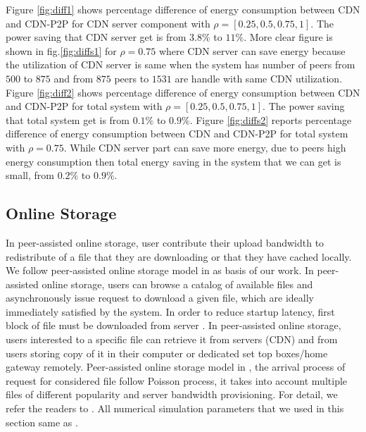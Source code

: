 Figure \ref{fig:diff1} shows percentage difference of energy consumption between CDN and CDN-P2P for CDN server component with $\rho=[0.25,0.5,0.75,1]$.
The power saving that CDN server get is from $3.8\%$ to $11\%$.
More clear figure is shown in fig.\ref{fig:diffs1} for $\rho=0.75$ where CDN server can save energy because the utilization of CDN server is same when the system has number of peers from $500$ to $875$ and from $875$ peers to $1531$ are handle with same CDN utilization.   
Figure \ref{fig:diff2} shows percentage difference of energy consumption between CDN and CDN-P2P for total system with $\rho=[0.25,0.5,0.75,1]$.
The power saving that total system get is from $0.1\%$ to $0.9\%$.
Figure \ref{fig:diffs2} reports percentage difference of energy consumption between CDN and CDN-P2P for total system with $\rho=0.75$.
While CDN server part can save more energy, due to peers high energy consumption then total energy saving in the system that we can get is small, from $0.2\%$ to $0.9\%$.


\subsection{Online Storage}

In peer-assisted online storage, user contribute their upload bandwidth to redistribute of a file that they are downloading or that they have cached locally.
We follow peer-assisted online storage model in \cite{Sun:2009:POS:1542245.1542249} as basis of our work. 
In peer-assisted online storage, users can browse a catalog of available files and asynchronously issue request to download a given file, which are ideally immediately satisfied by the system.
In order to reduce startup latency, first block of file must be downloaded from server \cite{5199550}.
In peer-assisted online storage, users interested to a specific file can retrieve it from servers (CDN) and from users storing copy of it in their computer or dedicated set top boxes/home gateway remotely.  
Peer-assisted online storage model in \cite{Sun:2009:POS:1542245.1542249}, the arrival process of request for considered file follow Poisson process, it takes into account multiple files of different popularity and server bandwidth provisioning.
For detail, we refer the readers to \cite{Sun:2009:POS:1542245.1542249,5199550,5061997}.
All numerical simulation parameters that we used in this section same as \cite{Sun:2009:POS:1542245.1542249}.


